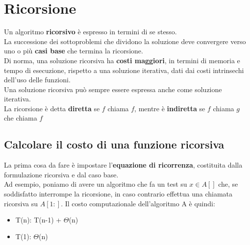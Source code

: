 \documentclass{report}
\newcommand{\T}[1]{$\Theta$(#1)}
\begin{document}
\section{Ricorsione}
    Un algoritmo \textbf{ricorsivo} è espresso in termini di se stesso. \\
    La successione dei sottoproblemi che dividono la soluzione deve convergere 
    verso uno o più \textbf{casi base} che termina la ricorsione. \\
    Di norma, una soluzione ricorsiva ha \textbf{costi maggiori}, in termini di memoria e 
    tempo di esecuzione, rispetto a una soluzione iterativa, dati dai costi intrinsechi
    dell'uso delle funzioni. \\
    Una soluzione ricorsiva può sempre essere espressa anche come soluzione iterativa. \\
    La ricorsione è detta \textbf{diretta} se $f$ chiama $f$, mentre è \textbf{indiretta} se $f$ chiama $g$ che
    chiama $f$
    \subsection{Calcolare il costo di una funzione ricorsiva}
        La prima cosa da fare è impostare l'\textbf{equazione di ricorrenza}, costituita dalla formulazione
        ricorsiva e dal caso base. \\
        Ad esempio, poniamo di avere un algoritmo che fa un test su $x \in A\left[\right]$ che, 
        se soddisfatto interrompe la ricorsione, in caso contrario effettua una chiamata ricorsiva 
        su $A\left[1:\right]$. Il costo computazionale dell'algoritmo A è quindi: 
        \begin{itemize}
            \item T(n): T(n-1) + \T{n}
            \item T(1): \T{n}
        \end{itemize}
\end{document}
